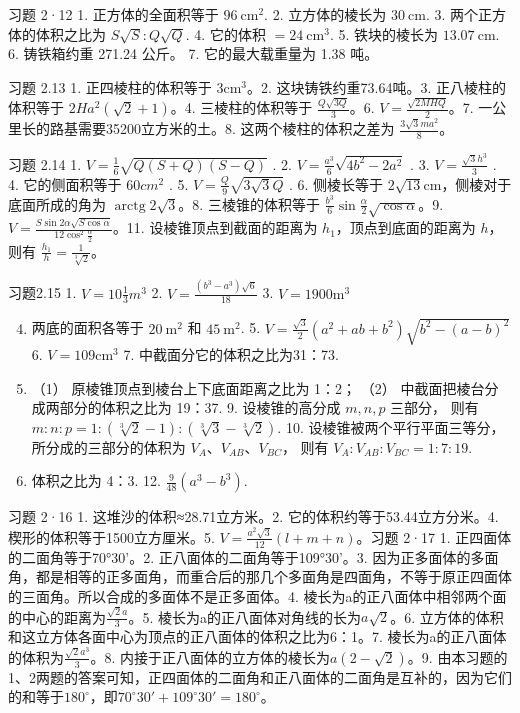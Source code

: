 习题 2·12 1. 正方体的全面积等于 \(96 \mathrm{~cm}^{2}\). 2.
立方体的棱长为 \(30 \mathrm{~cm}\). 3. 两个正方体的体积之比为
\(S \sqrt{S}: Q \sqrt{Q}\). 4. 它的体积 \(= 24 \mathrm{~cm}^{3}\). 5.
铁块的棱长为 \(13.07 \mathrm{~cm}\). 6. 铸铁箱约重 271.24 公斤。 7.
它的最大载重量为 1.38 吨。

习题 2.13 1. 正四棱柱的体积等于 \(3\mathrm{cm}^3\)。2.
这块铸铁约重73.64吨。3. 正八棱柱的体积等于 \(2H a^2 (\sqrt{2} + 1)\)。4.
三棱柱的体积等于 \(\frac{Q\sqrt{3Q}}{3}\)。6.
\(V = \frac{\sqrt{2MHQ}}{2}\)。7. 一公里长的路基需要35200立方米的土。8.
这两个棱柱的体积之差为 \(\frac{3\sqrt{3}ma^2}{8}\)。

习题 2.14 1. \(V=\frac{1}{6}\sqrt{Q(S+Q)(S-Q)}\) . 2.
\(V=\frac{a^{3}}{6}\sqrt{4b^{2}-2a^{2}}\) . 3.
\(V=\frac{\sqrt{3}h^{3}}{3}\) . 4. 它的侧面积等于 \(60cm^{2}\) . 5.
\(V=\frac{Q}{9}\sqrt{3\sqrt{3}Q}\) . 6. 侧棱长等于
\(2\sqrt{13}\mathrm{cm}\)，侧棱对于底面所成的角为
\(\operatorname{arctg} 2\sqrt{3}\)。8. 三棱锥的体积等于
\(\frac{b^3}{6} \sin \frac{\alpha}{2} \sqrt{\cos \alpha}\)。9.
\(V = \frac{S \sin 2\alpha \sqrt{S \cos \alpha}}{12 \cos^2 \frac{\alpha}{2}}\)。11.
设棱锥顶点到截面的距离为 \(h_1\)，顶点到底面的距离为 \(h\)，则有
\(\frac{h_1}{h} = \frac{1}{\sqrt[3]{2}}\)。

习题2.15 1. \(V = 10\frac{1}{3} m^3\) 2.
\(V = \frac{(b^3 - a^3)\sqrt{6}}{18}\) 3. \(V = 1900\mathrm{m}^3\)

\begin{enumerate}
\setcounter{enumi}{3}
\item
  两底的面积各等于 \(20 \mathrm{~m}^{2}\) 和 \(45 \mathrm{~m}^{2}\). 5.
  \(V = \frac{\sqrt{3}}{2} (a^{2} + ab + b^{2})\)\(\sqrt{b^{2} - (a - b)^{2}}\)
  6. \(V = 109\mathrm{cm}^3\) 7. 中截面分它的体积之比为31：73.
\item
  （1） 原棱锥顶点到棱台上下底面距离之比为 1：2； （2）
  中截面把棱台分成两部分的体积之比为 19：37. 9. 设棱锥的高分成
  \(m, n, p\) 三部分， 则有
  \(m:n:p=1:(\sqrt[3]{2}-1):(\sqrt[3]{3}-\sqrt[3]{2})\). 10.
  设棱锥被两个平行平面三等分， 所分成的三部分的体积为
  \(V_A\)、\(V_{AB}\)、\(V_{BC}\)， 则有 \(V_A:V_{AB}:V_{BC}=1:7:19\).
\item
  体积之比为 4：3. 12. \(\frac{9}{48} (a^3 - b^3)\).
\end{enumerate}

习题 2·16 1. 这堆沙的体积≈28.71立方米。2.
它的体积约等于53.44立方分米。4. 楔形的体积等于1500立方厘米。5.
\(V = \frac{a^2\sqrt{3}}{12}(l + m + n)\)。习题 2·17 1.
正四面体的二面角等于70°30'。2. 正八面体的二面角等于109°30'。3.
因为正多面体的多面角，都是相等的正多面角，而重合后的那几个多面角是四面角，不等于原正四面体的三面角。所以合成的多面体不是正多面体。4.
棱长为a的正八面体中相邻两个面的中心的距离为\(\frac{\sqrt{2}a}{3}\)。5.
棱长为a的正八面体对角线的长为\(a\sqrt{2}\)。6.
立方体的体积和这立方体各面中心为顶点的正八面体的体积之比为6：1。7.
棱长为a的正八面体的体积为\(\frac{\sqrt{2}a^3}{3}\)。8.
内接于正八面体的立方体的棱长为\(a(2-\sqrt{2})\)。9.
由本习题的1、2两题的答案可知，正四面体的二面角和正八面体的二面角是互补的，因为它们的和等于\(180^\circ\)，即\(70^\circ30' + 109^\circ30' = 180^\circ\)。

